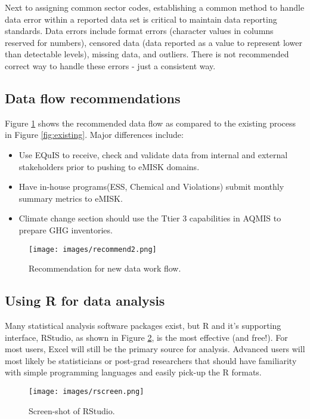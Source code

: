 Next to assigning common sector codes, establishing a common method to handle data error within a reported data set is critical to maintain data reporting standards. Data errors include format errors (character values in columns reserved for numbers), censored data (data reported as a value to represent lower than detectable levels), missing data, and outliers. There is not recommended correct way to handle these errors - just a consistent way.

\subsection{Data flow recommendations}

Figure \ref{fig:recommend1} shows the recommended data flow as compared to the existing process in Figure \ref{fig:existing}. Major differences include:
\begin{itemize}
\item{Use EQuIS to receive, check and validate data from internal and external stakeholders prior to pushing to eMISK domains.}
\item{Have in-house programs(ESS, Chemical and Violations) submit monthly summary metrics to eMISK.}
\item{Climate change section should use the Ttier 3 capabilities in AQMIS to prepare GHG inventories.}
\end{itemize}

\begin{figure}[H]
\centering
\texttt{[image: images/recommend2.png]} 
\caption{Recommendation for new data work flow.}
\label{fig:recommend1}
\end{figure}

\subsection{Using R for data analysis}
Many statistical analysis software packages exist, but R and it's supporting interface, RStudio, as shown in Figure \ref{fig:rscreen}, is the most effective (and free!).  For most users, Excel will still be the primary source for analysis. Advanced users will most likely be statisticians or post-grad researchers that should have familiarity with simple programming languages and easily pick-up the R formats. 

\begin{figure}[H]
\centering
\texttt{[image: images/rscreen.png]} 
\caption{Screen-shot of RStudio.}
\label{fig:rscreen}
\end{figure}

